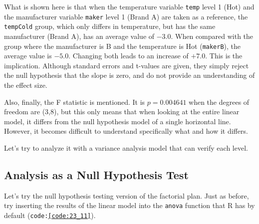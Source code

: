 \documentclass{ltjbook}
\begin{document}

What is shown here is that when the temperature variable \texttt{temp} level 1 (Hot) and the manufacturer variable \texttt{maker} level 1 (Brand A) are taken as a reference, the \texttt{tempCold} group, which only differs in temperature, but has the same manufacturer (Brand A), has an average value of $-3.0$. When compared with the group where the manufacturer is B and the temperature is Hot (\texttt{makerB}), the average value is $-5.0$. Changing both leads to an increase of $+7.0$. This is the implication. Although standard errors and t-values are given, they simply reject the null hypothesis that the slope is zero, and do not provide an understanding of the effect size.

Also, finally, the F statistic is mentioned. It is $p=0.004641$ when the degrees of freedom are (3,8), but this only means that when looking at the entire linear model, it differs from the null hypothesis model of a single horizontal line. However, it becomes difficult to understand specifically what and how it differs.

Let's try to analyze it with a variance analysis model that can verify each level.
\subsection{Analysis as a Null Hypothesis Test}
Let's try the null hypothesis testing version of the factorial plan. Just as before, try inserting the results of the linear model into the \texttt{anova} function that R has by default (\texttt{code:\ref{code:23_11}}).

\end{document}
